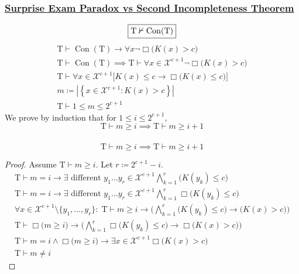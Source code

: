 \documentclass[UTF8,aspectratio=43,11pt,colorlinks,compress,openany]{beamer}%
\begin{document}
\begin{frame}\frametitle{\href{http://www.ams.org/notices/201011/rtx101101454p.pdf}{Surprise Exam Paradox vs Second Incompleteness Theorem}}
	\[\fbox{$\mathrm{T}\nvdash\operatorname{Con}(\mathrm{T})$}\]
	\begin{gather*}\label{chaitin_con}
	\mathrm{T}\vdash\operatorname{Con}(\mathrm{T})\to\forall x\neg\Box \big(K(x)>c\big)\tag{Chaitin}\\
	\mathrm{T}\vdash\operatorname{Con}(\mathrm{T})\implies\mathrm{T}\vdash\forall x\in\mathcal{X}^{c+1}\neg\Box \big(K(x)>c\big)\\
	\mathrm{T}\vdash\forall x\in\mathcal{X}^{c+1}\big[K(x)\leq c\to\Box \big(K(x)\leq c\big)\big]\tag{$\Sigma_1$-complete}\\
	m\coloneqq \left|\left\{x\in\mathcal{X}^{c+1}: K(x)>c\right\}\right|\\
	\mathrm{T}\vdash 1\leq m\leq 2^{c+1}
	\end{gather*}
	We prove by induction that for $1\leq i\leq 2^{c+1}$,
	\[\mathrm{T}\vdash m\geq i\implies\mathrm{T}\vdash m\geq i+1\]
\end{frame}

\begin{frame}\frametitle{}
	\[\mathrm{T}\vdash m\geq i\implies\mathrm{T}\vdash m\geq i+1\]
	\begin{proof}
		Assume $\mathrm{T}\vdash m\geq i$. Let $r\coloneqq 2^{c+1}-i$.
		\begin{gather*}
		\mathrm{T}\vdash m=i\to\exists\mbox{ different } y_1\dots y_r\in\mathcal{X}^{c+1}\bigwedge\limits_{k=1}^r\big(K(y_k)\leq c\big)\\
		\mathrm{T}\vdash m=i\to\exists\mbox{ different } y_1\dots y_r\in\mathcal{X}^{c+1}\bigwedge\limits_{k=1}^r\Box \big(K(y_k)\leq c\big)\\
		\forall x\in\mathcal{X}^{c+1}\setminus\!\{y_1,\dots,y_r\}:\;\mathrm{T}\vdash m\geq i\to\bigg(\bigwedge\limits_{k=1}^r\big(K(y_k)\leq c\big)\to\big(K(x)>c\big)\bigg)\\
		\mathrm{T}\vdash\Box \big(m\geq i\big)\to\bigg(\bigwedge\limits_{k=1}^r\Box \big(K(y_k)\leq c\big)\to\Box \big(K(x)>c\big)\bigg)\\
		\mathrm{T}\vdash m=i\wedge\Box \big(m\geq i\big)\to\exists x\in\mathcal{X}^{c+1}\Box \big(K(x)>c\big)\\
		\mathrm{T}\vdash m\neq i
		\end{gather*}
		\vspace{-4ex}
	\end{proof}
\end{frame}
\end{document}
